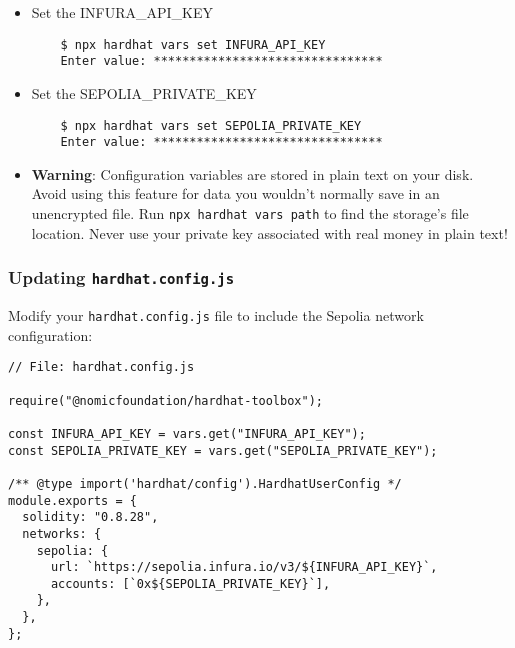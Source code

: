 \documentclass[12pt]{article}
\begin{document}
\begin{itemize}
    \item Set the INFURA\_API\_KEY
    
\begin{verbatim}
    $ npx hardhat vars set INFURA_API_KEY
    Enter value: ********************************
\end{verbatim}

    \item Set the SEPOLIA\_PRIVATE\_KEY

\begin{verbatim}
    $ npx hardhat vars set SEPOLIA_PRIVATE_KEY
    Enter value: ********************************
\end{verbatim}

\end{itemize}

\begin{itemize}
    \item \textbf{Warning}: Configuration variables are stored in plain text on your disk. Avoid using this feature for data you wouldn’t normally save in an unencrypted file. Run \texttt{npx hardhat vars path} to find the storage's file location. Never use your private key associated with real money in plain text!
\end{itemize}

\subsubsection*{Updating \texttt{hardhat.config.js}}

Modify your \texttt{hardhat.config.js} file to include the Sepolia network configuration:

\noindent
\begin{minipage}[c]{\textwidth}
\begin{verbatim}
// File: hardhat.config.js

require("@nomicfoundation/hardhat-toolbox");

const INFURA_API_KEY = vars.get("INFURA_API_KEY");
const SEPOLIA_PRIVATE_KEY = vars.get("SEPOLIA_PRIVATE_KEY");

/** @type import('hardhat/config').HardhatUserConfig */
module.exports = {
  solidity: "0.8.28",
  networks: {
    sepolia: {
      url: `https://sepolia.infura.io/v3/${INFURA_API_KEY}`,
      accounts: [`0x${SEPOLIA_PRIVATE_KEY}`],
    },
  },
};
\end{verbatim}
\end{minipage}
\end{document}
